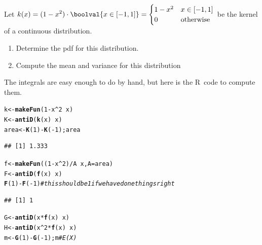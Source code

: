 \documentclass[twoside]{book}\usepackage[]{graphicx}\usepackage[]{xcolor}
\makeatletter
\newcommand{\hlnum}[1]{\textcolor[rgb]{0.686,0.059,0.569}{#1}}%
\newcommand{\hlcom}[1]{\textcolor[rgb]{0.678,0.584,0.686}{\textit{#1}}}%
\newcommand{\hlopt}[1]{\textcolor[rgb]{0,0,0}{#1}}%
\newcommand{\hlstd}[1]{\textcolor[rgb]{0.345,0.345,0.345}{#1}}%
\newcommand{\hlkwb}[1]{\textcolor[rgb]{0.69,0.353,0.396}{#1}}%
\newcommand{\hlkwc}[1]{\textcolor[rgb]{0.333,0.667,0.333}{#1}}%
\newcommand{\hlkwd}[1]{\textcolor[rgb]{0.737,0.353,0.396}{\textbf{#1}}}%
\newenvironment{kframe}{%
 \def\at@end@of@kframe{}%
 \ifinner\ifhmode%
  \def\at@end@of@kframe{\end{minipage}}%
  \begin{minipage}{\columnwidth}%
 \fi\fi%
 \def\FrameCommand##1{\hskip\@totalleftmargin \hskip-\fboxsep
 \colorbox{shadecolor}{##1}\hskip-\fboxsep
     \hskip-\linewidth \hskip-\@totalleftmargin \hskip\columnwidth}%
 \MakeFramed {\advance\hsize-\width
   \@totalleftmargin\z@ \linewidth\hsize
   \@setminipage}}%
 {\par\unskip\endMakeFramed%
 \at@end@of@kframe}
\newenvironment{knitrout}{}{} %
\def\R{{\sf R}}
\makeatother
\begin{document}
\begin{problem}
	Let $\displaystyle k(x) = (1 - x^2) \cdot \boolval{ x \in [-1,1] } = 
	\begin{cases}
		1-x^2 & x \in [-1,1] \\ 
		0 & \mbox{otherwise} 
	\end{cases}$ be the kernel of a continuous distribution.
	\begin{enumerate}
		\item
			Determine the pdf for this distribution.
		\item
			Compute the mean and variance for this distribution
	\end{enumerate}
\end{problem}

\begin{solution}
	The integrals are easy enough to do by hand, but here is the \R\ code 
	to compute them.
\begin{knitrout}
\color{fgcolor}\begin{kframe}
\begin{alltt}
\hlstd{k} \hlkwb{<-} \hlkwd{makeFun}\hlstd{(} \hlnum{1} \hlopt{-} \hlstd{x}\hlopt{^}\hlnum{2} \hlopt{~} \hlstd{x )}
\hlstd{K} \hlkwb{<-} \hlkwd{antiD}\hlstd{(} \hlkwd{k}\hlstd{(x)} \hlopt{~} \hlstd{x )}
\hlstd{area} \hlkwb{<-} \hlkwd{K}\hlstd{(}\hlnum{1}\hlstd{)} \hlopt{-} \hlkwd{K}\hlstd{(}\hlopt{-}\hlnum{1}\hlstd{); area}
\end{alltt}
\begin{verbatim}
## [1] 1.333
\end{verbatim}
\begin{alltt}
\hlstd{f} \hlkwb{<-} \hlkwd{makeFun}\hlstd{( (}\hlnum{1} \hlopt{-} \hlstd{x}\hlopt{^}\hlnum{2}\hlstd{)}\hlopt{/}\hlstd{A} \hlopt{~} \hlstd{x,} \hlkwc{A} \hlstd{= area )}
\hlstd{F} \hlkwb{<-} \hlkwd{antiD}\hlstd{(}\hlkwd{f}\hlstd{(x)} \hlopt{~} \hlstd{x)}
\hlkwd{F}\hlstd{(}\hlnum{1}\hlstd{)} \hlopt{-} \hlkwd{F}\hlstd{(}\hlopt{-}\hlnum{1}\hlstd{)}    \hlcom{# this should be 1 if we have done things right}
\end{alltt}
\begin{verbatim}
## [1] 1
\end{verbatim}
\begin{alltt}
\hlstd{G} \hlkwb{<-} \hlkwd{antiD}\hlstd{( x} \hlopt{*} \hlkwd{f}\hlstd{(x)} \hlopt{~} \hlstd{x )}
\hlstd{H} \hlkwb{<-} \hlkwd{antiD}\hlstd{( x}\hlopt{^}\hlnum{2} \hlopt{*} \hlkwd{f}\hlstd{(x)} \hlopt{~} \hlstd{x )}
\hlstd{m} \hlkwb{<-} \hlkwd{G}\hlstd{(}\hlnum{1}\hlstd{)} \hlopt{-} \hlkwd{G}\hlstd{(}\hlopt{-}\hlnum{1}\hlstd{); m}               \hlcom{# E(X)}

\end{alltt}
\end{kframe}
\end{knitrout}
\end{solution}
\end{document}
